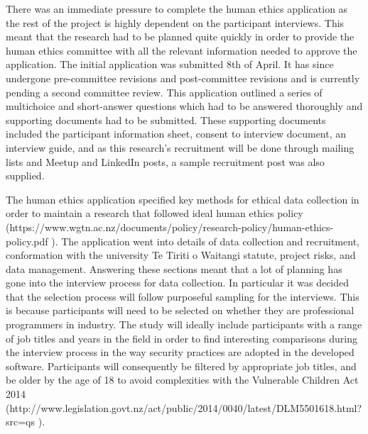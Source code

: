 \par There was an immediate pressure to complete the human ethics application as the rest of the project is highly dependent on the participant interviews. This meant that the research had to be planned quite quickly in order to provide the human ethics committee with all the relevant information needed to approve the application. The initial application was submitted 8th of April. It has since undergone pre-committee revisions and post-committee revisions and is currently pending a second committee review. This application outlined a series of multichoice and short-answer questions which had to be answered thoroughly and supporting documents had to be submitted. These supporting documents included the participant information sheet, consent to interview document, an interview guide, and as this research’s recruitment will be done through mailing lists and Meetup and LinkedIn posts, a sample recruitment post was also supplied. 
\newline
\par The human ethics application specified key methods for ethical data collection in order to maintain a research that followed ideal  human ethics policy
(https://www.wgtn.ac.nz/documents/policy/research-policy/human-ethics-policy.pdf
). The application went into details of data collection and recruitment, conformation with the university Te Tiriti o Waitangi statute, project risks, and data management. Answering these sections meant that a lot of planning has gone into the interview process for data collection. In particular it was decided that the selection process will follow purposeful sampling for the interviews. This is because participants will need to be selected on whether they are professional programmers in industry. The study will ideally include participants with a range of job titles and years in the field in order to find interesting comparisons during the interview process in the way security practices are adopted in the developed software. Participants will consequently be filtered by appropriate job titles, and be older by the age of 18 to avoid complexities with the Vulnerable Children Act 2014
(http://www.legislation.govt.nz/act/public/2014/0040/latest/DLM5501618.html?src=qs
). 
\newline
